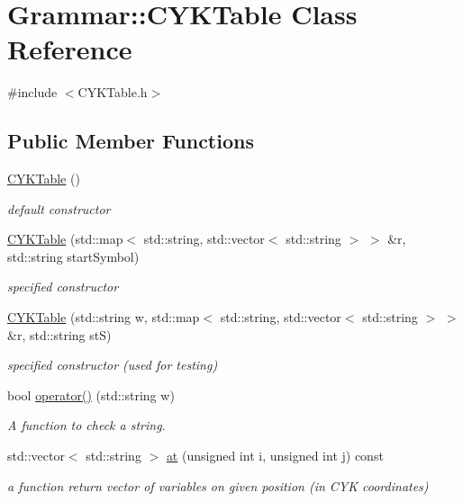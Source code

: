 \hypertarget{classGrammar_1_1CYKTable}{\section{\-Grammar\-:\-:\-C\-Y\-K\-Table \-Class \-Reference}
\label{dc/d7d/classGrammar_1_1CYKTable}
}


{\ttfamily \#include $<$\-C\-Y\-K\-Table.\-h$>$}

\subsection*{\-Public \-Member \-Functions}
\begin{DoxyCompactItemize}
\item 
\hyperlink{classGrammar_1_1CYKTable_a1fcb6e92bfbaaffd86e988791d2e1602}{\-C\-Y\-K\-Table} ()
\begin{DoxyCompactList}\small\item\em default constructor \end{DoxyCompactList}\item 
\hyperlink{classGrammar_1_1CYKTable_adbb3e7162af2f47b4683be53c02bdf5a}{\-C\-Y\-K\-Table} (std\-::map$<$ std\-::string, std\-::vector$<$ std\-::string $>$ $>$ \&r, std\-::string start\-Symbol)
\begin{DoxyCompactList}\small\item\em specified constructor \end{DoxyCompactList}\item 
\hyperlink{classGrammar_1_1CYKTable_a2fbb1d8a30608a2b5e71eada4ec8a5ae}{\-C\-Y\-K\-Table} (std\-::string w, std\-::map$<$ std\-::string, std\-::vector$<$ std\-::string $>$ $>$ \&r, std\-::string st\-S)
\begin{DoxyCompactList}\small\item\em specified constructor (used for testing) \end{DoxyCompactList}\item 
bool \hyperlink{classGrammar_1_1CYKTable_a7fce61d4ae3981da0c3f8c811cbb7ba3}{operator()} (std\-::string w)
\begin{DoxyCompactList}\small\item\em \-A function to check a string. \end{DoxyCompactList}\item 
std\-::vector$<$ std\-::string $>$ \hyperlink{classGrammar_1_1CYKTable_ac3897ef9932804f1ea544c6fd047ebc9}{at} (unsigned int i, unsigned int j) const 
\begin{DoxyCompactList}\small\item\em a function return vector of variables on given position (in \-C\-Y\-K coordinates) \end{DoxyCompactList}\item 

\end{DoxyCompactItemize}
